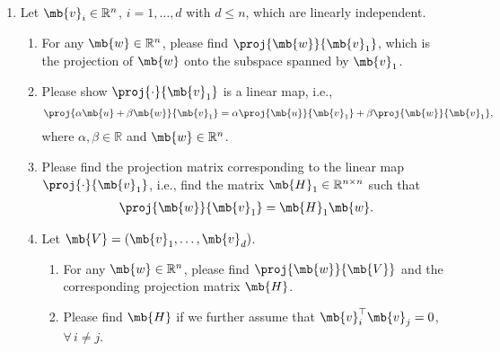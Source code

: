 \begin{exercise}[Projection ]
\begin{enumerate}
        \item Let $\mb{v}_i \in \mathbb{R}^n$, $i=1,\ldots,d$ with $d\leq n$, which are linearly independent.
            \begin{enumerate}
                \item For any $\mb{w}\in \mathbb{R}^n$, please find $\proj{\mb{w}}{\mb{v}_1}$, which is the projection of $\mb{w}$ onto the subspace spanned by $\mb{v}_1$.
                \item Please show $\proj{\cdot}{\mb{v}_1}$ is a linear map, i.e.,
                    \begin{align*}
                        \proj{\alpha\mb{u}+\beta\mb{w}}{\mb{v}_1}=\alpha\proj{\mb{u}}{\mb{v}_1} + \beta \proj{\mb{w}}{\mb{v}_1},
                    \end{align*}
                    where $\alpha,\beta\in\mathbb{R}$ and $\mb{w}\in\mathbb{R}^n$.
                \item Please find the projection matrix corresponding to the linear map $\proj{\cdot}{\mb{v}_1}$, i.e., find the matrix $\mb{H}_1\in\mathbb{R}^{n\times n}$ such that
                    \begin{align*}
                        \proj{\mb{w}}{\mb{v}_1}=\mb{H}_1\mb{w}.
                    \end{align*}
                \item Let $\mb{V}=(\mb{v}_1,\ldots,\mb{v}_d)$.
                    \begin{enumerate}
                        \item For any $\mb{w}\in \mathbb{R}^n$, please find $\proj{\mb{w}}{\mb{V}}$ and the corresponding projection matrix $\mb{H}$.
                        \item Please find $\mb{H}$ if we further assume that $\mb{v}_i^{\top}\mb{v}_j=0$, $\forall\,i\neq j$.
                    \end{enumerate}
            \end{enumerate}
            

\end{enumerate}
\end{exercise}
